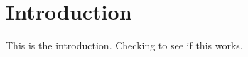 \hypertarget{index_intro_sec}{}\section{Introduction}\label{index_intro_sec}
This is the introduction. Checking to see if this works. 
